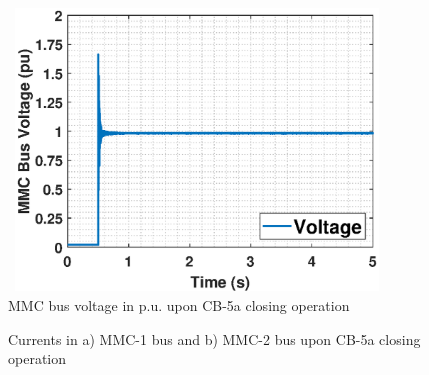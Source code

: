 \begin{figure}[H]
\centering
    \includegraphics[height = 7.5cm,width = 10cm]{Diagrams/Chapter_5/VACP_MMC_1_2_CB_5a.eps}
    \caption{MMC bus voltage in p.u. upon CB-5a closing operation}
    \label{fig:VACP_MMC_1_2_CB_5a}
\end{figure}

\begin{figure}[H]
\hspace*{-1.2cm}

\hspace*{-1.2cm}

\caption{Currents in a) MMC-1 bus and b) MMC-2 bus upon CB-5a closing operation}
\label{fig:IABC_MMC_1_2_CB_5a}
\end{figure}

